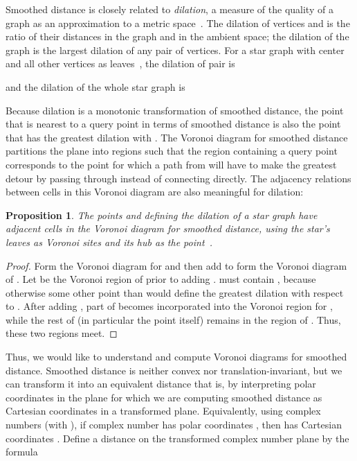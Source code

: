 \documentclass[10pt, conference, compsocconf]{IEEEtran}
\newtheorem{proposition}[theorem]{Proposition}
\begin{document}
Smoothed distance is closely related to \emph{dilation}, a measure of the quality of a graph as an approximation to a metric space~\cite{Epp-HCG-00}. The dilation of vertices  and  is the ratio of their distances in the graph and in the ambient space; the dilation of the graph is the largest dilation of any pair of vertices. For a star graph  with center  and all other vertices as leaves~\cite{EppWor-CGTA-07}, the dilation of pair  is

and the dilation of the whole star graph is


Because dilation is a monotonic transformation of smoothed distance, the point  that is nearest to a query point  in terms of smoothed distance is also the point that has the greatest dilation with . The Voronoi diagram for smoothed distance partitions the plane into regions such that the region containing a query point  corresponds to the point  for which a path from  will have to make the greatest detour by passing through  instead of connecting directly. The adjacency relations between cells in this Voronoi diagram are also meaningful for dilation:

\begin{proposition}
\label{prop:dilation-neighbors}
The points  and  defining the dilation of a star graph have adjacent cells in the Voronoi diagram for smoothed distance, using the star's leaves as Voronoi sites and its hub as the point~.
\end{proposition}

\begin{proof}
Form the Voronoi diagram for  and then add  to form the Voronoi diagram of . Let  be the Voronoi region of  prior to adding .
 must contain , because otherwise some other point than  would define the greatest dilation with respect to . After adding , part of  becomes incorporated into the Voronoi region for , while the rest of  (in particular the point  itself) remains in the region of . Thus, these two regions meet.
\end{proof}

Thus, we would like to understand and compute Voronoi diagrams for smoothed distance. Smoothed distance is neither convex nor translation-invariant, but we can transform it into an equivalent distance that is, by interpreting polar coordinates in the plane for which we are computing smoothed distance as Cartesian coordinates in a transformed plane. Equivalently, using complex numbers (with ), if complex number  has polar coordinates , then  has Cartesian coordinates . Define a distance  on the transformed complex number plane by the formula
\end{document}
